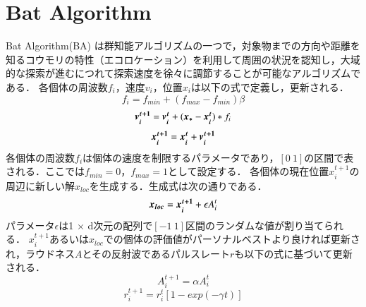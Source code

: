 \documentclass[twocolumn, a4paper]{UECIEresume}
\begin{document}
\section{Bat Algorithm}
Bat Algorithm(BA) \cite{BA} は群知能アルゴリズムの一つで，対象物までの方向や距離を知るコウモリの特性（エコロケーション）を利用して周囲の状況を認知し，大域的な探索が進むにつれて探索速度を徐々に調節することが可能なアルゴリズムである．
各個体の周波数${f_i}$，速度${v_i}$，位置${x_i}$は以下の式で定義し，更新される．
\begin{equation}
f_{i} =f_{min}+(f_{max}-f_{min}) \beta
\label{eq:freq} 
\end{equation}
\begin{equation}
\mbox{\boldmath $v_i^{t+1}$}=\mbox{\boldmath $v_i^{t}$}+(\mbox{\boldmath $x_*$}-\mbox{\boldmath $x_i^t$})* f_i
\label{eq:vel}
\end{equation}
\begin{equation}
\mbox{\boldmath $x_i^{t+1}$}=\mbox{\boldmath $x_i^{t}$}+\mbox{\boldmath $v_i^{t+1}$}
\label{eq:xi}
\end{equation}
各個体の周波数${f_i}$は個体の速度を制限するパラメータであり，$[0 \ 1]$の区間で表される．ここでは${f_{min}=0}$，${f_{max}=1}$として設定する．
各個体の現在位置${x_i^{t+1}}$の周辺に新しい解${x_{loc}}$を生成する．生成式は次の通りである．
\begin{equation}
\label{eq:loc}
\mbox{\boldmath $x_{loc}$}=\mbox{\boldmath $x_i^{t+1}$} + \epsilon A_i^t
\end{equation}
パラメータ$\epsilon$は1 $\times$ d次元の配列で$[-1 \ 1]$区間のランダムな値が割り当てられる． ${x_i^{t+1}}$あるいは${x_{loc}}$での個体の評価値がパーソナルベストより良ければ更新され，ラウドネス$A$とその反射波であるパルスレート$r$も以下の式に基づいて更新される．
\begin{equation}
\label{eq:loud}
A_i^{t+1}= \alpha A_i^t
\end{equation}
\begin{equation}
\label{eq:pulse}
r_i^{t+1}=r_i^t[1-exp(- \gamma t)]
\end{equation}
\end{document}
